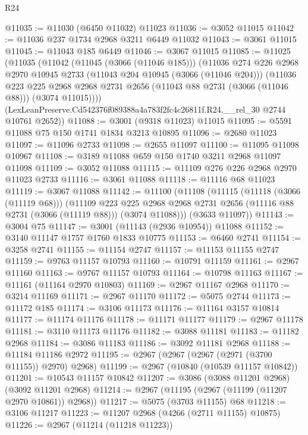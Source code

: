 \begin{lexlean}{R24}
\begin{coremodule}
@11035 := @11030 (@6450 @11032) @11023
@11036 := @3052 @11015
@11042 := @11036 @237 @1734 @2968 @3211 @6449 @11032
@11043 := @3061 @11015
@11045 := @11043 @185 @6449
@11046 := @3067 @11015
@11085 := @11025
    (@11035
      (@11042
        (@11045 (@3066 (@11046 @185)))
        (@11036
          @274
          @226
          @2968
          @2970
          @10945
          @2733
          (@11043 @204 @10945 (@3066 (@11046 @204)))
          (@11036
            @223
            @225
            @2968
            @2968
            @2731
            @2656
            (@11043 @88 @2731 (@3066 (@11046 @88)))
            (@3074 @11015))))
      (LexLeanPreserve.Cd542376f089388a4a783f2fc4c26811f.R24.__rel_30 @2744 @10761 @2652))
@11088 := @3001 (@9318 @11023) @11015
@11095 := @5591 @11088 @75 @150 @1741 @1834 @3213 @10895
@11096 := @2680 @11023
@11097 := @11096 @2733
@11098 := @2655 @11097
@11100 := @11095 @11098 @10967
@11108 := @3189 @11088 @659 @150 @1740 @3211 @2968 @11097 @11098
@11109 := @3052 @11088
@11115 := @11109 @276 @226 @2968 @2970 @11023 @2733
@11116 := @3061 @11088
@11118 := @11116 @68 @11023
@11119 := @3067 @11088
@11142 := @11100
    (@11108
      (@11115
        (@11118 (@3066 (@11119 @68)))
        (@11109
          @223
          @225
          @2968
          @2968
          @2731
          @2656
          (@11116 @88 @2731 (@3066 (@11119 @88)))
          (@3074 @11088)))
      (@3633 @11097))
@11143 := @3004 @75
@11147 := @3001 (@11143 (@2936 @10954)) @11088
@11152 := @3140 @11147 @1757 @1760 @1833 @10775
@11153 := @6460 @2741
@11154 := @3258 @2741
@11155 := @11154 @2747
@11157 := @11153 @11155 @2747
@11159 := @9763 @11157 @10793
@11160 := @10791 @11159
@11161 := @2967 @11160
@11163 := @9767 @11157 @10793
@11164 := @10798 @11163
@11167 := @11161 (@11164 @2970 @10803)
@11169 := @2967 @11167 @2968
@11170 := @3214 @11169
@11171 := @2967 @11170
@11172 := @5075 @2744
@11173 := @11172 @185
@11174 := @3106 @11173
@11176 := @11164 @3157 @10814
@11177 := @11174 @11176
@11178 := @11171 @11177
@11179 := @2967 @11178
@11181 := @3110 @11173 @11176
@11182 := @3088 @11181
@11183 := @11182 @2968
@11184 := @3086 @11183
@11186 := @3092 @11181 @2968
@11188 := @11184 @11186 @2972
@11195 := @2967 (@2967 (@2967 (@2971 (@3700 @11155)) @2970) @2968)
@11199 := @2967 (@10840 (@10539 @11157 @10842))
@11201 := @10543 @11157 @10842
@11207 := @3086 (@3088 @11201 @2968) (@3092 @11201 @2968)
@11214 := @2967 (@11195 (@2967 (@11199 (@11207 @2970 @10861)) @2968))
@11217 := @5075 (@3703 @11155) @68
@11218 := @3106 @11217
@11223 := @11207 @2968 (@4266 (@2711 @11155) @10875)
@11226 := @2967 (@11214 (@11218 @11223))

\end{coremodule}
\end{lexlean}
